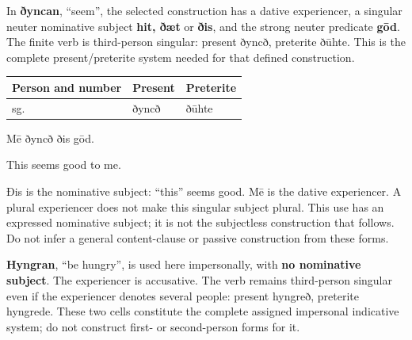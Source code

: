 In \textbf{ðyncan}, “seem”, the selected construction has a dative experiencer, a singular neuter nominative subject \textbf{hit, ðæt} or \textbf{ðis}, and the strong neuter predicate \textbf{gōd}. The finite verb is third-person singular: present ðyncð, preterite ðūhte. This is the complete present/\allowbreak{}preterite system needed for that defined construction.

\par\begingroup
\fontsize{10.5}{13.2}\selectfont
\setlength{\LTleft}{0pt}\setlength{\LTright}{\fill}
\noindent
\begin{tabular}{@{}>{\raggedright\arraybackslash}p{39.459mm}>{\raggedright\arraybackslash}p{39.459mm}>{\raggedright\arraybackslash}p{39.459mm}@{}}
\toprule
\textbf{Person and number} & \textbf{Present} & \textbf{Preterite} \\
\midrule
3 sg. & ðyncð & ðūhte \\
\bottomrule
\end{tabular}
\par\endgroup
Mē ðyncð ðis gōd.

This seems good to me.

Ðis is the nominative subject: “this” seems good. Mē is the dative experiencer. A plural experiencer does not make this singular subject plural. This use has an expressed nominative subject; it is not the subjectless construction that follows. Do not infer a general content-clause or passive construction from these forms.

\textbf{Hyngran}, “be hungry”, is used here impersonally, with \textbf{no nominative subject}. The experiencer is accusative. The verb remains third-person singular even if the experiencer denotes several people: present hyngreð, preterite hyngrede. These two cells constitute the complete assigned impersonal indicative system; do not construct first- or second-person forms for it.

